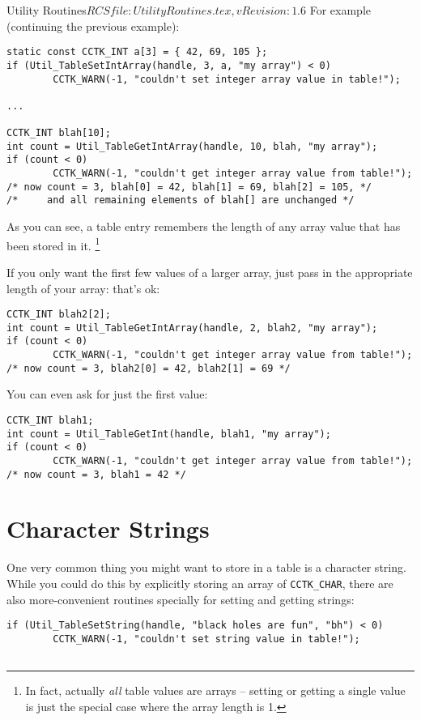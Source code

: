 \begin{cactuspart}{3}{Utility Routines}{$RCSfile: UtilityRoutines.tex,v $}{$Revision: 1.6 $}
For example (continuing the previous example):
\begin{verbatim}
static const CCTK_INT a[3] = { 42, 69, 105 };
if (Util_TableSetIntArray(handle, 3, a, "my array") < 0)
        CCTK_WARN(-1, "couldn't set integer array value in table!");

...

CCTK_INT blah[10];
int count = Util_TableGetIntArray(handle, 10, blah, "my array");
if (count < 0)
        CCTK_WARN(-1, "couldn't get integer array value from table!");
/* now count = 3, blah[0] = 42, blah[1] = 69, blah[2] = 105, */
/*     and all remaining elements of blah[] are unchanged */
\end{verbatim}
As you can see, a table entry remembers the length of any array
value that has been stored in it.%
\footnote{%
	 In fact, actually {\em all\/} table values are
	 arrays -- setting or getting a single value is
	 just the special case where the array length is 1.
	 }%
{}

If you only want the first few values of a larger array, just pass
in the appropriate length of your array:
that's ok:
\begin{verbatim}
CCTK_INT blah2[2];
int count = Util_TableGetIntArray(handle, 2, blah2, "my array");
if (count < 0)
        CCTK_WARN(-1, "couldn't get integer array value from table!");
/* now count = 3, blah2[0] = 42, blah2[1] = 69 */
\end{verbatim}
You can even ask for just the first value:
\begin{verbatim}
CCTK_INT blah1;
int count = Util_TableGetInt(handle, blah1, "my array");
if (count < 0)
        CCTK_WARN(-1, "couldn't get integer array value from table!");
/* now count = 3, blah1 = 42 */
\end{verbatim}


\section{Character Strings}

One very common thing you might want to store in a table is a
character string.  While you could do this by explicitly storing
an array of \verb|CCTK_CHAR|, there are also more-convenient routines
specially for setting and getting strings:
\begin{verbatim}
if (Util_TableSetString(handle, "black holes are fun", "bh") < 0)
        CCTK_WARN(-1, "couldn't set string value in table!");


\end{verbatim}
\end{cactuspart}
